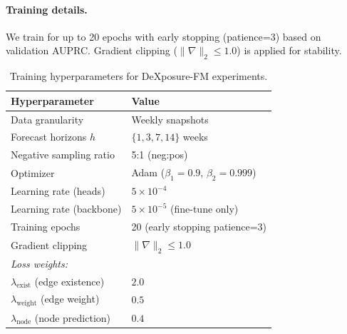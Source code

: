 \paragraph{Training details.}
We train for up to 20 epochs with early stopping (patience=3) based on validation AUPRC. Gradient clipping ($\|\nabla\|_2 \le 1.0$) is applied for stability.

\begin{table}[t]
\centering
\small
\setlength{\tabcolsep}{6pt}
\renewcommand{\arraystretch}{1.05}
\begin{tabular}{ll}
\hline
\textbf{Hyperparameter} & \textbf{Value} \\
\hline
Data granularity & Weekly snapshots \\
Forecast horizons $h$ & $\{1, 3, 7, 14\}$ weeks \\
Negative sampling ratio & 5:1 (neg:pos) \\
Optimizer & Adam ($\beta_1=0.9$, $\beta_2=0.999$) \\
Learning rate (heads) & $5 \times 10^{-4}$ \\
Learning rate (backbone) & $5 \times 10^{-5}$ (fine-tune only) \\
Training epochs & 20 (early stopping patience=3) \\
Gradient clipping & $\|\nabla\|_2 \le 1.0$ \\
\hline
\multicolumn{2}{l}{\textit{Loss weights:}} \\
$\lambda_{\mathrm{exist}}$ (edge existence) & $2.0$ \\
$\lambda_{\mathrm{weight}}$ (edge weight) & $0.5$ \\
$\lambda_{\mathrm{node}}$ (node prediction) & $0.4$ \\
\hline
\end{tabular}
\caption{Training hyperparameters for DeXposure-FM experiments.}
\label{tab:training-hparams}
\end{table}
